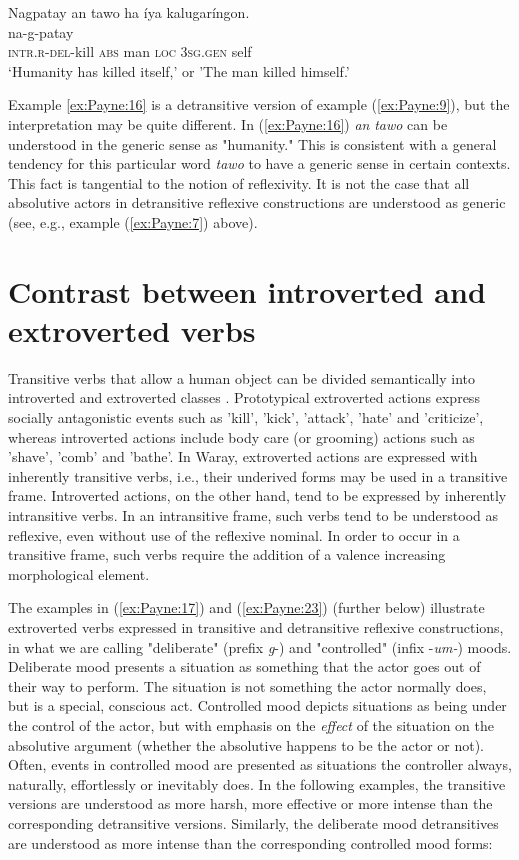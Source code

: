 \documentclass[output=paper]{langscibook}
\begin{document}
\ea \label{ex:Payne:16}
\glll
{Nagpatay} {an} {tawo} {ha} {íya} {kalugaríngon.}\\
na-g-patay  { } { } { } { } { }\\
\textsc{intr.r-del}{}-kill \textsc{abs} man \textsc{loc} 3\textsc{sg.gen} self\\
\glt ‘Humanity has killed itself,' or 'The man killed himself.'
\z 

Example \ref{ex:Payne:16} is a detransitive version of example (\ref{ex:Payne:9}), but the interpretation may be quite different. In (\ref{ex:Payne:16}) \textit{an} \textit{tawo} can be understood in the generic sense as "humanity." This is consistent with a general tendency for this particular word \textit{tawo} to have a generic sense in certain contexts. This fact is tangential to the notion of reflexivity. It is not the case that all absolutive actors in detransitive reflexive constructions are understood as generic (see, e.g., example (\ref{ex:Payne:7}) above).


\section{Contrast between introverted and extroverted verbs}\label{sec:Payne:5}
Transitive verbs that allow a human object can be divided semantically into introverted and extroverted classes \citep[803]{Haiman1980}. Prototypical extroverted actions express socially antagonistic events such as 'kill', 'kick', 'attack', 'hate' and 'criticize', whereas introverted actions include body care (or grooming) actions such as 'shave', 'comb' and 'bathe'. In Waray, extroverted actions are expressed with inherently transitive verbs, i.e., their underived forms may be used in a transitive frame. Introverted actions, on the other hand, tend to be expressed by inherently intransitive verbs. In an intransitive frame, such verbs tend to be understood as reflexive, even without use of the reflexive nominal. In order to occur in a transitive frame, such verbs require the addition of a valence increasing morphological element.

The examples in (\ref{ex:Payne:17}) and (\ref{ex:Payne:23}) (further below) illustrate extroverted verbs expressed in transitive and detransitive reflexive constructions, in what we are calling "deliberate" (prefix \textit{g}{}-) and "controlled" (infix \nobreakdash-\textit{um-}) moods. Deliberate mood presents a situation as something that the actor goes out of their way to perform. The situation is not something the actor normally does, but is a special, conscious act. Controlled mood depicts situations as being under the control of the actor, but with emphasis on the \textit{effect} of the situation on the absolutive argument (whether the absolutive happens to be the actor or not). Often, events in controlled mood are presented as situations the controller always, naturally, effortlessly or inevitably does. In the following examples, the transitive versions are understood as more harsh, more effective or more intense than the corresponding detransitive versions. Similarly, the deliberate mood detransitives are understood as more intense than the corresponding controlled mood forms:
\end{document}
